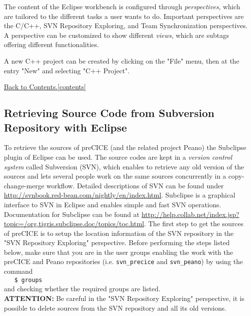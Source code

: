 \documentclass[11pt, oneside]{scrartcl}
\newcommand{\backtocontents}{\hyperref[contents]{Back to Contents.\ref*{contents}}}
\begin{document}
The content of the Eclipse workbench is configured through
\textit{perspectives}, which are tailored to the different tasks a user wants to
do. Important perspectives are the C/C++, SVN Repository Exploring, and Team
Synchronization perspectives. A perspective can be customized to show different
\textit{views}, which are subtags offering different functionalities.

A new C++ project can be created by clicking on the "File" menu, then at the
entry "New" and selecting "C++ Project".
   
\backtocontents   
   

\subsection{Retrieving Source Code from Subversion Repository with Eclipse} 
\label{sec:setup_retrieve_sources}
    
To retrieve the sources of preCICE (and the related project Peano) the Subclipse
plugin of Eclipse can be used. The source codes are kept in a \textit{version
control system} called Subversion (SVN), which enables to retrieve any old
version of the sources and lets several people work on the same sources
concurrently in a copy-change-merge workflow. Detailed descriptions of SVN can
be found under \url{http://svnbook.red-bean.com/nightly/en/index.html}.
Subclipse is a graphical interface to SVN in Eclipse and enables simple and fast
SVN operations. Documentation for Subclipse can be found at
\url{http://help.collab.net/index.jsp?topic=/org.tigris.subclipse.doc/topics/toc.html}.
The first step to get the sources of preCICE is to setup the location
information of the SVN repository in the "SVN Repository Exploring" perspective.
Before performing the steps listed below, make sure that you are in the user
groups enabling the work with the preCICE and Peano repositories (i.e.
\texttt{svn\_precice} and \texttt{svn\_peano}) by using the command
\\[2mm] 
\verb|   $ groups | 
\\[2mm]
and checking whether the required groups are listed.
\\[3mm] 

\textbf{ATTENTION:} Be careful in the "SVN Repository Exploring" perspective, it
is possible to delete sources from the SVN repository and all its old versions.
\\[3mm]
\end{document}
